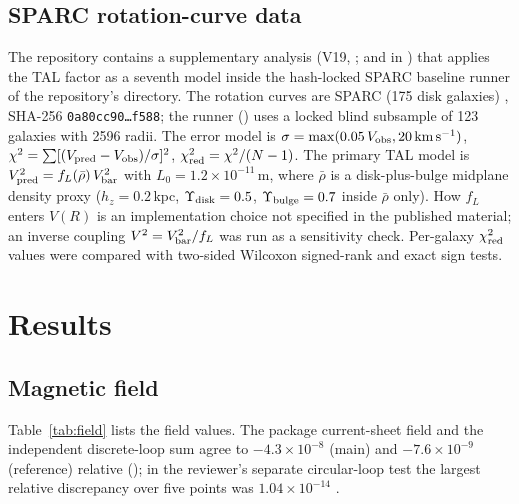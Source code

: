 \documentclass[12pt,a4paper]{article}
\begin{document}
\subsection{SPARC rotation-curve data}\label{sec:sparc_method}
The repository contains a supplementary analysis (V19, \cite{TAL_V19};  and
 in \cite{TAL_repo}) that applies the TAL factor as a seventh model inside the
hash-locked SPARC baseline runner of the repository's  directory. The rotation curves are
SPARC  (175 disk galaxies) \cite{Lelli2016}, SHA-256
\texttt{0a80cc90\ldots f588}; the runner () uses a locked blind subsample
 of 123 galaxies with 2596 radii. The error model is $\sigma=\max(0.05\,V_{\rm obs},20\,\mathrm{km\,s^{-1}})$,
$\chi^2=\sum[(V_{\rm pred}-V_{\rm obs})/\sigma]^2$, $\chi^2_{\rm red}=\chi^2/(N-1)$. The primary TAL model is
$V_{\rm pred}^2=f_L(\bar\rho)\,V_{\rm bar}^2$ with $L_0=1.2\times10^{-11}$\,m, where $\bar\rho$ is a disk-plus-bulge
midplane density proxy ($h_z=0.2$\,kpc, $\Upsilon_{\rm disk}=0.5$, $\Upsilon_{\rm bulge}=0.7$ inside $\bar\rho$ only).
How $f_L$ enters $V(R)$ is an implementation choice not specified in the published material; an inverse coupling
$V^2=V_{\rm bar}^2/f_L$ was run as a sensitivity check. Per-galaxy $\chi^2_{\rm red}$ values were compared with
two-sided Wilcoxon signed-rank and exact sign tests.

\section{Results}\label{sec:results}

\subsection{Magnetic field}
Table~\ref{tab:field} lists the field values. The package current-sheet field and the independent
discrete-loop sum agree to $-4.3\times10^{-8}$ (main) and $-7.6\times10^{-9}$ (reference) relative
(); in the reviewer's separate circular-loop test the largest relative
discrepancy over five points was $1.04\times10^{-14}$ \cite{TAL_V20}.
\end{document}
